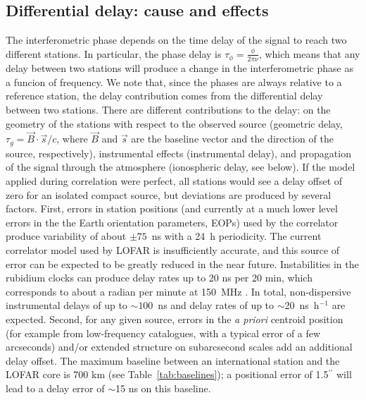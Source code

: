 \documentclass[graybox]{svmult}
\begin{document}
\subsection{Differential delay: cause and effects}

The interferometric phase depends on the time delay of the signal to reach two
different stations. In particular, the phase delay is
$\tau_{\phi}=\frac{\phi}{2\pi\nu}$, which means that any delay between two
stations will produce a change in the interferometric phase as a funcion of
frequency.  We note that, since the phases are always relative to a reference
station, the delay contribution comes from the differential delay between two
stations. There are different contributions to the delay: on the geometry of
the stations with respect to the observed source (geometric delay,
$\tau_{g}=\vec{B}\cdot\vec{s}/c$, where $\vec{B}$ and $\vec{s}$ are the
baseline vector and the direction of the source, respectively), instrumental
effects (instrumental delay), and propagation of the signal through the
atmosphere (ionospheric delay, see below). If the model applied during
correlation were perfect, all stations would see a delay offset of zero for an
isolated compact source, but deviations are produced by several factors. First,
errors in station positions (and currently at a much lower level errors in the
the Earth orientation parameters, EOPs) used by the correlator produce
variability of about $\pm75$~ns with a 24~h periodicity.  The current
correlator model used by LOFAR is insufficiently accurate, and this source of
error can be expected to be greatly reduced in the near future.  Instabilities
in the rubidium clocks can produce delay rates up to 20 ns per 20 min, which
corresponds to about a radian per minute at 150~MHz \citep{vanhaarlem13}.  In
total, non-dispersive instrumental delays of up to $\sim100$~ns and delay rates
of up to $\sim$20~ns~h$^{-1}$ are expected.  Second, for any given source,
errors in the {\em a priori} centroid position (for example from low-frequency
catalogues, with a typical error of a few arcseconds) and/or extended structure
on subarcsecond scales add an additional delay offset.  The maximum baseline
between an international station and the LOFAR core is 700 km (see
Table~\ref{tab:baselines}); a positional error of 1.5$^{\prime\prime}$ will
lead to a delay error of $\sim$15 ns on this baseline.
\end{document}
